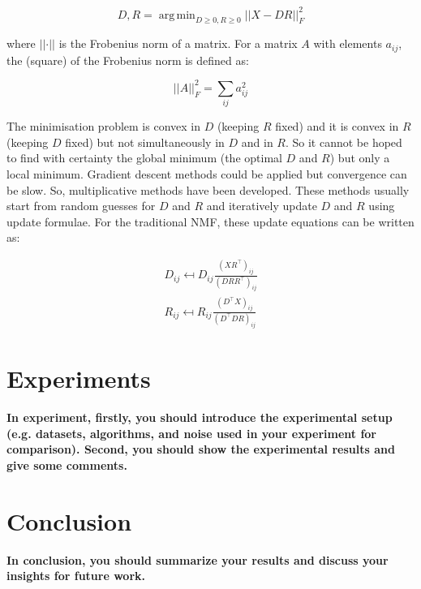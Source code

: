 \documentclass{article} %
\DeclareMathOperator*{\argmin}{arg\,min}
\begin{document}
\begin{equation}
D, R = \argmin_{D\geq 0, R\geq 0}\lvert\lvert X - DR\rvert\rvert_{F}^{2}
\end{equation}

where $\lvert\lvert\cdot\rvert\rvert$ is the Frobenius norm of a matrix. For a matrix $A$ with elements $a_{ij}$, the (square) of the Frobenius norm is defined as:

\begin{equation}
\lvert\lvert A \rvert\rvert_{F}^{2} = \sum_{ij} a_{ij}^{2}
\end{equation}

The minimisation problem is convex in $D$ (keeping $R$ fixed) and it is convex in $R$ (keeping $D$ fixed) but not simultaneously in $D$ and in $R$. So it cannot be hoped to find with certainty the global minimum (the optimal $D$ and $R$) but only a local minimum. Gradient descent methods could be applied but convergence can be slow. So, multiplicative methods have been developed. These methods usually start from random guesses for $D$ and $R$ and iteratively update $D$ and $R$ using update formulae. For the traditional NMF, these update equations can be written as:

\begin{equation}
\begin{split}
D_{ij} \mapsfrom D_{ij}\frac{(XR^{\top})_{ij}}{(DRR^{\top})_{ij}} \\
R_{ij} \mapsfrom R_{ij}\frac{(D^{\top}X)_{ij}}{(D^{\top}DR)_{ij}}
\end{split}
\end{equation}   

\subsection{}

\section{Experiments}
\textbf{In experiment, firstly, you should introduce the experimental setup (e.g. datasets, algorithms, and noise used in your experiment for comparison). Second, you should show the experimental results and give some comments.}

\section{Conclusion}
\textbf{In conclusion, you should summarize your results and discuss your insights for future work.}
\end{document}
